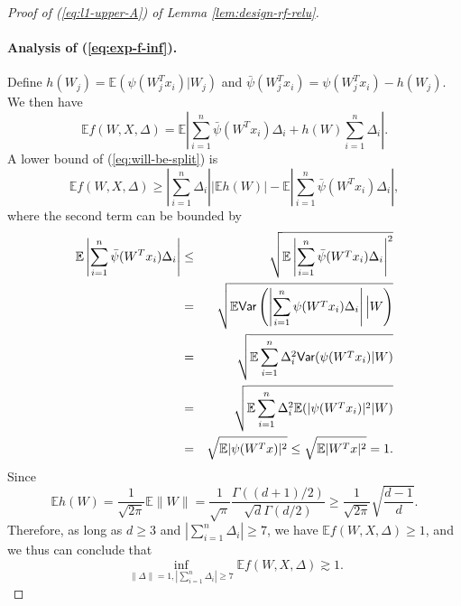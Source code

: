 \begin{proof}[Proof of (\ref{eq:l1-upper-A}) of Lemma \ref{lem:design-rf-relu}]
\paragraph{Analysis of (\ref{eq:exp-f-inf}).} Define $h(W_j)=\mathbb{E}(\psi(W_j^Tx_i)|W_j)$ and $\bar{\psi}(W_j^Tx_i)=\psi(W_j^Tx_i)-h(W_j)$. We then have
\begin{equation}
\mathbb{E}f(W,X,\Delta)=\mathbb{E}\left|\sum_{i=1}^n\bar{\psi}(W^Tx_i)\Delta_i+h(W)\sum_{i=1}^n\Delta_i\right|. \label{eq:will-be-split}
\end{equation}
A lower bound of (\ref{eq:will-be-split}) is
$$\mathbb{E}f(W,X,\Delta)\geq \left|\sum_{i=1}^n\Delta_i\right|\left|\mathbb{E}h(W)\right|-\mathbb{E}\left|\sum_{i=1}^n\bar{\psi}(W^Tx_i)\Delta_i\right|,$$
where the second term can be bounded by
\begin{eqnarray*}
\mathbb{E}\left|\sum_{i=1}^n\bar{\psi}(W^Tx_i)\Delta_i\right| &\leq& \sqrt{\mathbb{E}\left|\sum_{i=1}^n\bar{\psi}(W^Tx_i)\Delta_i\right|^2} \\
&=& \sqrt{\mathbb{E}\Var\left(\left|\sum_{i=1}^n\psi(W^Tx_i)\Delta_i\right|\Big|W\right)} \\
&=& \sqrt{\mathbb{E}\sum_{i=1}^n\Delta_i^2\Var(\psi(W^Tx_i)|W)} \\
&=& \sqrt{\mathbb{E}\sum_{i=1}^n\Delta_i^2\mathbb{E}(|\psi(W^Tx_i)|^2|W)} \\
&=& \sqrt{\mathbb{E}|\psi(W^Tx)|^2} \leq \sqrt{\mathbb{E}|W^Tx|^2} = 1.
\end{eqnarray*}
Since
$$\mathbb{E}h(W)=\frac{1}{\sqrt{2\pi}}\mathbb{E}\|W\|=\frac{1}{\sqrt{\pi}}\frac{\Gamma((d+1)/2)}{\sqrt{d}\Gamma(d/2)}\geq \frac{1}{\sqrt{2\pi}}\sqrt{\frac{d-1}{d}}.$$
Therefore, as long as $d\geq 3$ and $\left|\sum_{i=1}^n\Delta_i\right|\geq 7$, we have $\mathbb{E}f(W,X,\Delta)\geq 1$, and we thus can conclude that
\begin{equation}
\inf_{\|\Delta\|=1,|\sum_{i=1}^n\Delta_i|\geq 7}\mathbb{E}f(W,X,\Delta) \gtrsim 1.\label{eq:l1-1-1}
\end{equation}


\end{proof}
